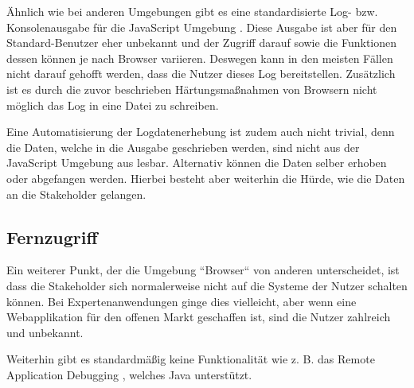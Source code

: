 Ähnlich wie bei anderen Umgebungen gibt es eine standardisierte Log- bzw. Konsolenausgabe für die JavaScript Umgebung \cite{MDNConsole}. Diese Ausgabe ist aber für den Standard-Benutzer eher unbekannt und der Zugriff darauf sowie die Funktionen dessen können je nach Browser variieren. Deswegen kann in den meisten Fällen nicht darauf gehofft werden, dass die Nutzer dieses Log bereitstellen. Zusätzlich ist es durch die zuvor beschrieben Härtungsmaßnahmen von Browsern nicht möglich das Log in eine Datei zu schreiben.

Eine Automatisierung der Logdatenerhebung ist zudem auch nicht trivial, denn die Daten, welche in die Ausgabe geschrieben werden, sind nicht aus der JavaScript Umgebung aus lesbar. Alternativ können die Daten selber erhoben oder abgefangen werden. Hierbei besteht aber weiterhin die Hürde, wie die Daten an die Stakeholder gelangen.

\subsection{Fernzugriff}

Ein weiterer Punkt, der die Umgebung ``Browser`` von anderen unterscheidet, ist dass die Stakeholder sich normalerweise nicht auf die Systeme der Nutzer schalten können. Bei Expertenanwendungen ginge dies vielleicht, aber wenn eine Webapplikation für den offenen Markt geschaffen ist, sind die Nutzer zahlreich und unbekannt.

Weiterhin gibt es standardmäßig keine Funktionalität wie z. B. das Remote Application Debugging \cite{JavaDebugWireProtocol}, welches Java unterstützt.